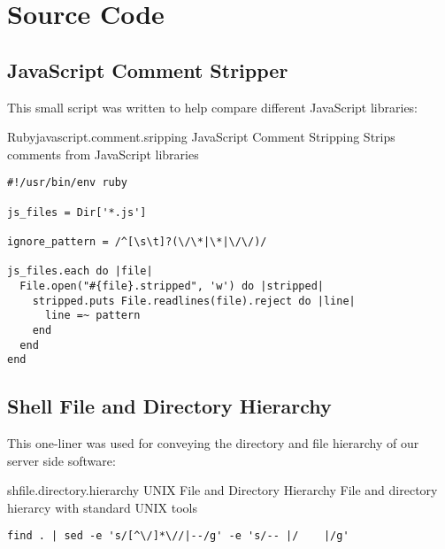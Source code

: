 \chapter{Source Code}

\section{JavaScript Comment Stripper}
\label{section:source.code.javascript.comment.stripper}

This small script was written to help
compare different JavaScript libraries:


\begin{scode}{Ruby}{javascript.comment.sripping}{%
  JavaScript Comment Stripping}{%
  Strips comments from JavaScript libraries}
\begin{lstlisting}
#!/usr/bin/env ruby

js_files = Dir['*.js']

ignore_pattern = /^[\s\t]?(\/\*|\*|\/\/)/

js_files.each do |file|
  File.open("#{file}.stripped", 'w') do |stripped| 
    stripped.puts File.readlines(file).reject do |line|
      line =~ pattern
    end
  end
end
\end{lstlisting}
\end{scode}

\section{Shell File and Directory Hierarchy}
\label{section:source.code.hierarchy}

This one-liner was used for conveying the directory and file hierarchy of our
server side software:

\begin{scode}{sh}{file.directory.hierarchy}{%
  UNIX File and Directory Hierarchy}{%
  File and directory hierarcy with standard UNIX tools}
\begin{lstlisting}
find . | sed -e 's/[^\/]*\//|--/g' -e 's/-- |/    |/g'
\end{lstlisting}
\end{scode}
